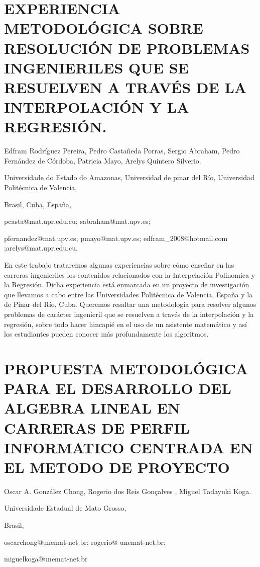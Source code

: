 \section{EXPERIENCIA METODOLÓGICA SOBRE RESOLUCIÓN DE PROBLEMAS INGENIERILES
QUE SE RESUELVEN A TRAVÉS DE LA INTERPOLACIÓN Y LA REGRESIÓN. }

\begin{datos}

Edfram Rodríguez Pereira, Pedro Castañeda Porras, Sergio Abraham,
Pedro Fernández de Córdoba, Patricia Mayo, Arelys Quintero Silverio. 

Universidade do Estado do Amazonas, Universidad de pinar del Río,
Universidad Politécnica de Valencia,

Brasil, Cuba, España,

pcasta@mat.upr.edu.cu; sabraham@mat.upv.es;

pfernandez@mat.upv.es; pmayo@mat.upv.es; edfram\_2008@hotmail.com
;arelys@mat.upr.edu.cu. 

\end{datos}

En este trabajo trataremos algunas experiencias sobre cómo enseñar
en las carreras ingenieriles los contenidos relacionados con la Interpelación
Polinomica y la Regresión. Dicha experiencia está enmarcada en un
proyecto de investigación que llevamos a cabo entre las Universidades
Politécnica de Valencia, España y la de Pinar del Río, Cuba. Queremos
resaltar una metodología para resolver algunos problemas de carácter
ingenieril que se resuelven a través de la interpolación y la regresión,
sobre todo hacer hincapié en el uso de un asistente matemático y así
los estudiantes pueden conocer más profundamente los algoritmos.


\section{PROPUESTA METODOLÓGICA PARA EL DESARROLLO DEL ALGEBRA LINEAL EN CARRERAS
DE PERFIL INFORMATICO CENTRADA EN EL METODO DE PROYECTO}

\begin{datos}

Oscar A. González Chong, Rogerio dos Reis Gonçalves , Miguel Tadayuki
Koga.

Universidade Estadual de Mato Grosso, 

Brasil,

oscarchong@unemat-net.br; rogerio@ unemat-net.br;

miguelkoga@unemat-net.br 

\end{datos}

